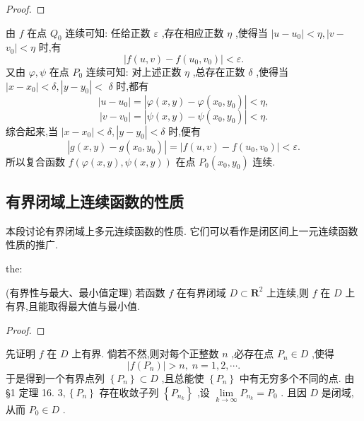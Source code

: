 \begin{proof}

\end{proof}
由 \(f\) 在点 \({Q}_{0}\) 连续可知: 任给正数 \(\varepsilon\) ,存在相应正数 \(\eta\) ,使得当 \(\left| {u - {u}_{0}}\right|  < \eta , \mid  v -\)  \({v}_{0} \mid   < \eta\) 时,有
\[
\left| {f\left( {u,v}\right)  - f\left( {{u}_{0},{v}_{0}}\right) }\right|  < \varepsilon .
\]
又由 \(\varphi ,\psi\) 在点 \({P}_{0}\) 连续可知: 对上述正数 \(\eta\) ,总存在正数 \(\delta\) ,使得当 \(\left| {x - {x}_{0}}\right|  < \delta ,\left| {y - {y}_{0}}\right|  <\)  \(\delta\) 时,都有
\[
\left| {u - {u}_{0}}\right|  = \left| {\varphi \left( {x,y}\right)  - \varphi \left( {{x}_{0},{y}_{0}}\right) }\right|  < \eta ,
\]
\[
\left| {v - {v}_{0}}\right|  = \left| {\psi \left( {x,y}\right)  - \psi \left( {{x}_{0},{y}_{0}}\right) }\right|  < \eta .
\]
综合起来,当 \(\left| {x - {x}_{0}}\right|  < \delta ,\left| {y - {y}_{0}}\right|  < \delta\) 时,便有
\[
\left| {g\left( {x,y}\right)  - g\left( {{x}_{0},{y}_{0}}\right) }\right|  = \left| {f\left( {u,v}\right)  - f\left( {{u}_{0},{v}_{0}}\right) }\right|  < \varepsilon .
\]
所以复合函数 \(f\left( {\varphi \left( {x,y}\right) ,\psi \left( {x,y}\right) }\right)\) 在点 \({P}_{0}\left( {{x}_{0},{y}_{0}}\right)\) 连续.

\subsection{有界闭域上连续函数的性质}

本段讨论有界闭域上多元连续函数的性质. 它们可以看作是闭区间上一元连续函数性质的推广.

\begin{theorem}{}{the:}

\end{theorem}
 (有界性与最大、最小值定理) 若函数 \(f\) 在有界闭域 \(D \subset  {\mathbf{R}}^{2}\) 上连续,则 \(f\) 在 \(D\) 上有界,且能取得最大值与最小值.

\begin{proof}

\end{proof}
先证明 \(f\) 在 \(D\) 上有界. 倘若不然,则对每个正整数 \(n\) ,必存在点 \({P}_{n} \in  D\) ,使得
\[
\left| {f\left( {P}_{n}\right) }\right|  > n,\;n = 1,2,\cdots . \tag{3}
\]
于是得到一个有界点列 \(\left\{  {P}_{n}\right\}   \subset  D\) ,且总能使 \(\left\{  {P}_{n}\right\}\) 中有无穷多个不同的点. 由 §1 定理 16. \(3,\left\{  {P}_{n}\right\}\) 存在收敛子列 \(\left\{  {P}_{{n}_{k}}\right\}\) ,设 \(\mathop{\lim }\limits_{{k \rightarrow  \infty }}{P}_{{n}_{k}} = {P}_{0}\) . 且因 \(D\) 是闭域,从而 \({P}_{0} \in  D\) .

